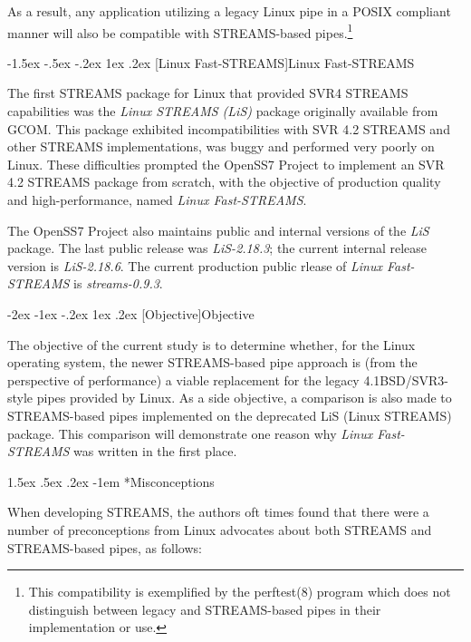 \documentclass[letterpaper,final,notitlepage,twocolumn,10pt,twoside]{article}
\makeatletter
\renewcommand\section{\@startsection {section}{1}{\z@}%
                                   {-2ex \@plus -1ex \@minus -.2ex}%
                                   {1ex \@plus .2ex}%
                                   {\normalfont\large\bfseries}}
\renewcommand\subsection{\@startsection{subsection}{2}{\z@}%
                                     {-1.5ex \@plus -.5ex \@minus -.2ex}%
                                     {1ex \@plus .2ex}%
                                     {\normalfont\normalsize\bfseries}}
\renewcommand\paragraph{\@startsection{paragraph}{4}{\z@}%
                                    {1.5ex \@plus .5ex \@minus .2ex}%
                                    {-1em}%
                                    {\normalfont\normalsize\bfseries\slshape}}
\makeatother
\begin{document}
As a result, any application utilizing a legacy Linux pipe in a POSIX
compliant manner will also be compatible with STREAMS-based
pipes.\footnote{This compatibility is exemplified by the perftest(8) program
which does not distinguish between legacy and STREAMS-based pipes in their
implementation or use.}

\subsection[Linux Fast-STREAMS]{Linux Fast-STREAMS}

The first STREAMS package for Linux that provided SVR4 STREAMS capabilities
was the \textsl{Linux STREAMS (LiS)} package originally available from GCOM.
This package exhibited incompatibilities with SVR 4.2 STREAMS and other
STREAMS implementations, was buggy and performed very poorly on Linux.  These
difficulties prompted the OpenSS7 Project \cite[]{openss7} to implement an SVR
4.2 STREAMS package from scratch, with the objective of production quality and
high-performance, named \textsl{Linux Fast-STREAMS}.

The OpenSS7 Project \cite[]{openss7} also maintains public and internal
versions of the \textsl{LiS} package.  The last public release was
\textit{LiS-2.18.3}; the current internal release version is
\textit{LiS-2.18.6}.  The current production public rlease of \textsl{Linux
Fast-STREAMS} is \textit{streams-0.9.3}.

\section[Objective]{Objective}

The objective of the current study is to determine whether, for the Linux
operating system, the newer STREAMS-based pipe approach is (from the
perspective of performance) a viable replacement for the legacy
4.1BSD/SVR3-style pipes provided by Linux.  As a side objective, a comparison
is also made to STREAMS-based pipes implemented on the deprecated LiS (Linux
STREAMS) package.  This comparison will demonstrate one reason why
\textsl{Linux Fast-STREAMS} was written in the first place.

\paragraph*{Misconceptions}

When developing STREAMS, the authors oft times found that there were a number
of preconceptions from Linux advocates about both STREAMS and STREAMS-based
pipes, as follows:
\end{document}
